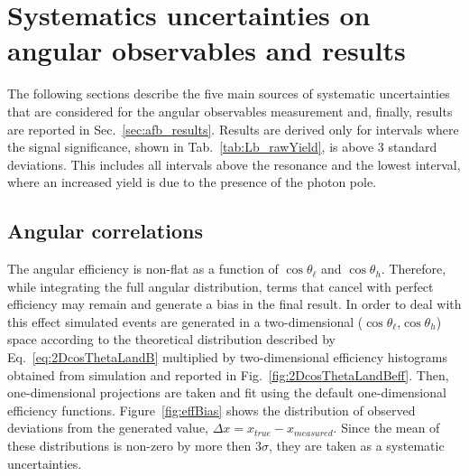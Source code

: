 \chapter{Systematics uncertainties on angular observables and results}
\label{sec:ang_results}

The following sections describe the five main sources of systematic uncertainties
that are considered for the angular observables measurement and, finally, results are
reported in Sec.~\ref{sec:afb_results}. Results are derived only for \qsq intervals
where the signal significance, shown in Tab.~\ref{tab:Lb_rawYield}, is above 3 standard
deviations. This includes all \qsq intervals above the \jpsi resonance and the lowest 
\qsq interval, where an increased yield is due to the presence of the photon pole.



\section{Angular correlations}

The angular efficiency is non-flat as a function of $\cos\theta_\ell$ and $\cos \theta_h$.
Therefore, while integrating the full angular distribution, terms that cancel with perfect efficiency
may remain and generate a bias in the final result. In order to deal with this effect simulated events are
generated in a two-dimensional ($\cos\theta_\ell$,$\cos \theta_h$) space according to the
theoretical distribution described by Eq.~\ref{eq:2DcosThetaLandB} multiplied by two-dimensional efficiency
histograms obtained from simulation and reported in Fig.~\ref{fig:2DcosThetaLandBeff}.
Then, one-dimensional projections are taken and fit using the default one-dimensional efficiency functions.
Figure~\ref{fig:effBias} shows the distribution of observed deviations from the generated 
value, $\Delta x = x_{true} - x_{measured}$.
Since the mean of these distributions is non-zero by more then 3$\sigma$, they are taken as a systematic uncertainties.

